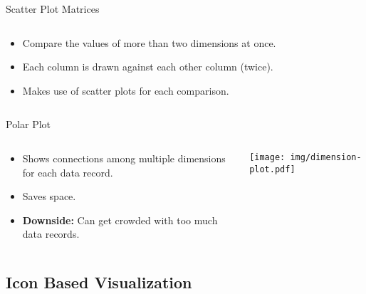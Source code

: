 \begin{frame}{Scatter Plot Matrices}
	\begin{columns}[t]
		\begin{column}{0.45\textwidth}
			\begin{itemize}
				\item Compare the values of more than two dimensions at once.
				\item Each column is drawn against each other column (twice).
				\item Makes use of scatter plots for each comparison.
			\end{itemize}
		\end{column}
		\begin{column}{0.45\textwidth}
			\vspace*{-0.3cm}
			\begin{center}
			\end{center}
		\end{column}
	\end{columns}

\end{frame}

\begin{frame}{Polar Plot}
	\begin{columns}[t]
		\begin{column}{0.45\textwidth}
			\begin{itemize}
				\item Shows connections among multiple dimensions for each data record.
				\item Saves space.
				\item \textbf{Downside:} Can get crowded with too much data records.
			\end{itemize}
		\end{column}
		\begin{column}{0.45\textwidth}
			\begin{center}
				\texttt{[image: img/dimension-plot.pdf]}
			\end{center}
		\end{column}
	\end{columns}
\end{frame}

\subsection{Icon Based Visualization}

